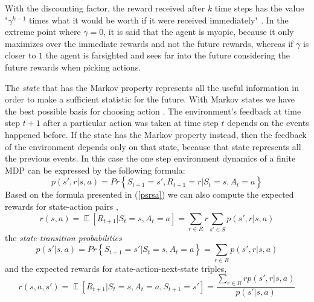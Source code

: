 With the discounting factor, the reward received after $k$ time steps has the value "$\gamma ^{k-1}$ times what it would be worth if it were received immediately" \cite{Sutton}. In the extreme point where $\gamma=0$, it is said that the agent is myopic, because it only maximizes over the immediate rewards and not the future rewards, whereas if $\gamma$ is closer to $1$ the agent is farsighted and sees far into the future considering the future rewards when picking actions.

The \textit{state} that has the Markov property represents all the useful information in order to make a sufficient statistic for the future. With Markov states we have the best possible basis for choosing action \cite{Sutton}. The environment's feedback at time step $t+1$ after a particular action was taken at time step $t$ depends on the events happened before. If the state has the Markov property instead, then the feedback of the environment depends only on that state, because that state represents all the previous events. In this case the one step environment dynamics of a finite MDP can be expressed by the following formula:
\begin{equation}\label{psrsa}
p(s',r|s,a)=Pr\left \{ S_{t+1}=s',R_{t+1}=r|S_{t}=s,A_{t}=a \right \}
\end{equation}
Based on the formula presented in (\ref{psrsa}) we can also compute the expected rewards for state-action pairs \cite{Sutton},
\begin{equation}
r(s,a)=\mathop{{}\mathbb{E}}\left [ R_{t+1}|S_{t}=s,A_{t}=a \right ]=\sum_{r\in R}r\sum_{s'\in S}p(s',r|s,a)
\end{equation}
the \textit{state-transition probabilities}
\begin{equation}
p(s'|s,a)=Pr\left \{ S_{t+1}=s'|S_{t}=s,A_{t}=a \right \}=\sum_{r\in R}p(s',r|s,a)
\end{equation}
and the expected rewards for state-action-next-state triples,
\begin{equation}
r(s,a,s')=\mathop{{}\mathbb{E}}\left [ R_{t+1}|S_{t}=s,A_{t}=a,S_{t+1}=s' \right ]=
\frac{\sum_{r\in R}rp(s',r|s,a)}{p(s'|s,a)}
\end{equation}